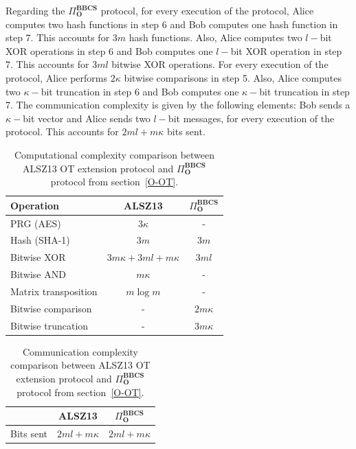 Regarding the $\Pi^{\textbf{BBCS}}_{\textbf{O}}$ protocol, for every execution of the protocol, Alice computes two hash functions in step 6 and Bob computes one hash function in step 7. This accounts for $3m$ hash functions. Also, Alice computes two $l-$bit XOR operations in step 6 and Bob computes one $l-$bit XOR operation in step 7. This accounts for $3ml$ bitwise XOR operations. For every execution of the protocol, Alice performs $2\kappa$ bitwise comparisons in step 5. Also, Alice computes two $\kappa-$bit truncation in step 6 and Bob computes one $\kappa-$bit truncation in step 7. The communication complexity is given by the following elements: Bob sends a $\kappa-$bit vector and Alice sends two $l-$bit messages, for every execution of the protocol. This accounts for $2ml + m\kappa$ bits sent.

\begin{table}[h!]
\centering
\begin{tabular}{lcc}
\toprule
Operation & ALSZ13 & $\Pi^{\textbf{BBCS}}_{\textbf{O}}$ \\
\midrule
PRG (AES)     & $3\kappa$              & -\\ 
Hash (SHA-1)    & $3m$              & $3m$ \\ 
Bitwise XOR      & $3 m \kappa + 3ml + m\kappa$             & $3ml$  \\ 
Bitwise AND  & $m\kappa$              & -           \\
Matrix transposition & $m\log m$              & -           \\
Bitwise comparison & -             & $2m\kappa$           \\
Bitwise truncation & -            & $3m\kappa$           \\
\bottomrule
\end{tabular}
\caption{Computational complexity comparison between ALSZ13 \cite{ALSZ13} OT extension protocol and $\Pi^{\textbf{BBCS}}_{\textbf{O}}$ protocol from section~\ref{O-OT}.}
\label{table:CvsQ_OT_comparison_computation}
\end{table}

\begin{table}[h!]
\centering
\begin{tabular}{lcc}
\toprule
 & ALSZ13 & $\Pi^{\textbf{BBCS}}_{\textbf{O}}$  \\
\midrule
\multicolumn{1}{l}{Bits sent }   & $2ml  + m\kappa$   & $2ml + m\kappa $  \\
\bottomrule
\end{tabular}
\caption{Communication complexity comparison between ALSZ13 \cite{ALSZ13} OT extension protocol and $\Pi^{\textbf{BBCS}}_{\textbf{O}}$ protocol from section~\ref{O-OT}.}
\label{table:CvsQ_OT_comparison_communication}
\end{table}

